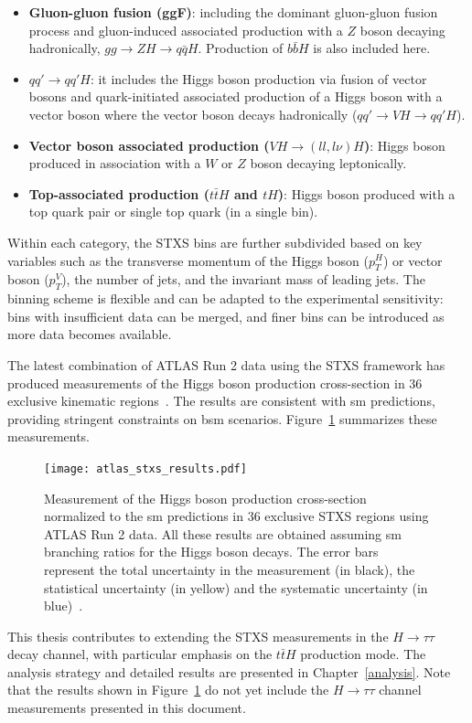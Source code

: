 \begin{itemize}
    \item \textbf{Gluon-gluon fusion (ggF)}: including the dominant gluon-gluon fusion process and gluon-induced associated production with a $Z$ boson decaying hadronically, $gg \to ZH \to q\bar{q}H$. Production of $b\bar{b}H$ is also included here.
    \item \textbf{$qq'\to qq'H$}: it includes the Higgs boson production via fusion of vector bosons and quark-initiated associated production of a Higgs boson with a vector boson where the vector boson decays hadronically ($qq'\to VH \to qq'H$).
    \item \textbf{Vector boson associated production ($VH \to (ll, l\nu)H$)}: Higgs boson produced in association with a $W$ or $Z$ boson decaying leptonically.
    \item \textbf{Top-associated production ($t\bar{t}H$ and $tH$)}: Higgs boson produced with a top quark pair or single top quark (in a single bin).
\end{itemize}

Within each category, the STXS bins are further subdivided based on key variables such as the transverse momentum of the Higgs boson ($p^H_T$) or vector boson ($p^V_T$), the number of jets, and the invariant mass of leading jets. The binning scheme is flexible and can be adapted to the experimental sensitivity: bins with insufficient data can be merged, and finer bins can be introduced as more data becomes available.

The latest combination of ATLAS Run 2 data using the STXS framework has produced measurements of the Higgs boson production cross-section in 36 exclusive kinematic regions~\cite{Nature_ATLAS}. The results are consistent with \acrshort{sm} predictions, providing stringent constraints on \acrshort{bsm} scenarios. Figure~\ref{fig:atlas-stxs-results} summarizes these measurements.

\begin{figure}[htbp]
    \centering
    \texttt{[image: atlas\_stxs\_results.pdf]}
    \caption{Measurement of the Higgs boson production cross-section normalized to the \acrshort{sm} predictions in 36 exclusive STXS regions using ATLAS Run 2 data. All these results are obtained assuming \acrshort{sm} branching ratios for the Higgs boson decays. The error bars represent the total uncertainty in the measurement (in black), the statistical uncertainty (in yellow) and the systematic uncertainty (in blue)~\cite{Nature_ATLAS}.}
    \label{fig:atlas-stxs-results}
\end{figure}

This thesis contributes to extending the STXS measurements in the $H \to \tau \tau$ decay channel, with particular emphasis on the $t\bar{t}H$ production mode. The analysis strategy and detailed results are presented in Chapter~\ref{analysis}. Note that the results shown in Figure~\ref{fig:atlas-stxs-results} do not yet include the $H \to \tau \tau$ channel measurements presented in this document.

